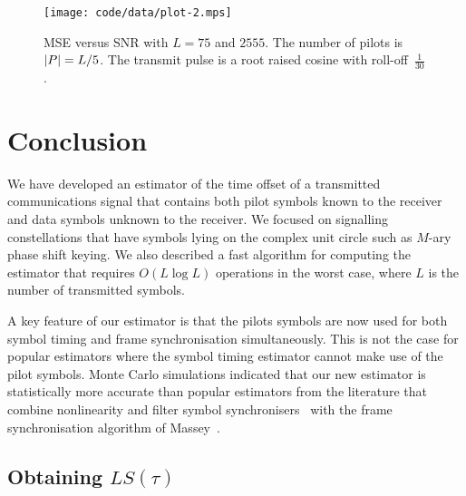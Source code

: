 \documentclass[journal]{IEEEtranTCOM}
\begin{document}
\begin{figure*}[p]
	\centering
		\texttt{[image: code/data/plot-2.mps]}
		\caption{MSE versus SNR with $L=75$ and $2555$.  The number of pilots is ${\left\vert P \right\vert} = L/5$.  The transmit pulse is a root raised cosine with roll-off~$\tfrac{1}{30}$.}
		\label{fig:plot2}
\end{figure*}




\section{Conclusion}

We have developed an estimator of the time offset of a transmitted communications signal that contains both pilot symbols known to the receiver and data symbols unknown to the receiver.  We focused on signalling constellations that have symbols lying on the complex unit circle such as $M$-ary phase shift keying.  We also described a fast algorithm for computing the estimator that requires $O(L\log L)$ operations in the worst case, where $L$ is the number of transmitted symbols.

A key feature of our estimator is that the pilots symbols are now used for both symbol timing and frame synchronisation simultaneously.  This is not the case for popular estimators where the symbol timing estimator cannot make use of the pilot symbols.  Monte Carlo simulations indicated that our new estimator is statistically more accurate than popular estimators from the literature that combine nonlinearity and filter symbol synchronisers~\cite{Oerder_synch_square_circstat_1988,Panayirci_eval_per_symbtim_1996} with the frame synchronisation algorithm of Massey~\cite{Massey1972optimumframe}. 


\appendix

\subsection{Obtaining $LS(\tau)$}\label{app:obtaining-sstau}
\end{document}
